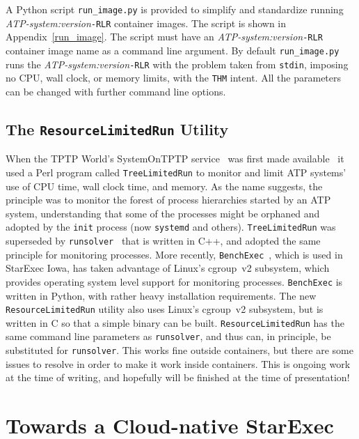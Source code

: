 \documentclass{easychair}
\begin{document}
A Python script {\tt run\_image.py} is provided to simplify and standardize running 
{\em ATP-system:version}{\tt -RLR} container images.
The script is shown in Appendix~\ref{run_image}.
The script must have an {\em ATP-system:version}{\tt -RLR} container image name as a 
command line argument.
By default {\tt run\_image.py} runs the {\em ATP-system:version}{\tt -RLR} with the problem 
taken from {\tt stdin}, imposing no CPU, wall clock, or memory limits, with the {\tt THM} intent.
All the parameters can be changed with further command line options.

\subsection{The {\tt ResourceLimitedRun} Utility}
\label{RLR}

When the TPTP World's SystemOnTPTP service~\cite{Sut00-CADE-17} was first made 
available~\cite{Sut07-CSR} it used a Perl program called {\tt TreeLimitedRun} to monitor and 
limit ATP systems' use of CPU time, wall clock time, and memory.
As the name suggests, the principle was to monitor the forest of process hierarchies started by
an ATP system, understanding that some of the processes might be orphaned and adopted by the
{\tt init} process (now {\tt systemd} and others).
{\tt TreeLimitedRun} was superseded by {\tt runsolver}~\cite{Rou11} that is written in C++, and
adopted the same principle for monitoring processes.
More recently, {\tt BenchExec}~\cite{BLW19}, which is used in StarExec Iowa, has taken advantage 
of Linux's cgroup~v2 subsystem, which provides operating system level support for monitoring 
processes.
{\tt BenchExec} is written in Python, with rather heavy installation requirements.
The new {\tt ResourceLimitedRun} utility also uses Linux's cgroup~v2 subsystem, but is written
in C so that a simple binary can be built.
{\tt ResourceLimitedRun} has the same command line parameters as {\tt runsolver}, and thus
can, in principle, be substituted for {\tt runsolver}.
This works fine outside containers, but there are some issues to resolve in order to make
it work inside containers.
This is ongoing work at the time of writing, and hopefully will be finished at the time of
presentation!

\section{Towards a Cloud-native StarExec}
\label{StarExecK}
\end{document}
